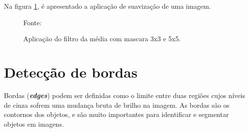 Na figura \ref{subfig:suavizacao}, é apresentado a aplicação de suavização de uma imagem.

\begin{figure}[h]
 \centering
    \qquad
    \qquad
   \caption{ Aplicação do filtro da média com mascara 3x3 e 5x5.}
      Fonte: \cite{imagemDigital2019}
  \label{subfig:suavizacao}
\end{figure}

\section{Detecção de bordas}
\label{sec:bordas}

Bordas (\textit{\textbf{edges}}) podem ser definidas como o limite entre duas regiões cujos níveis de cinza sofrem uma mudança bruta de brilho na imagem. As bordas são os contornos dos objetos, e são muito importantes para identificar e segmentar objetos em imagens.\cite{digitalImgProcess2010}

